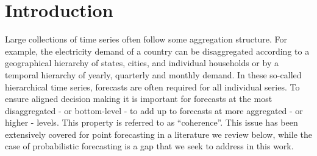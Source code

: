 \documentclass[a4paper, 11pt]{article}
\theoremstyle{theo}
\theoremstyle{definition}
\begin{document}
\section{Introduction}\label{sec:intro}

Large collections of time series often follow some aggregation structure.  For example, the electricity demand of a country can be disaggregated according to a geographical hierarchy of states, cities, and individual households or by a temporal hierarchy of yearly, quarterly and monthly demand. In these so-called hierarchical time series, forecasts are often required for all individual series.  To ensure aligned decision making it is important for forecasts at the most disaggregated - or bottom-level - to add up to forecasts at more aggregated - or higher - levels. This property is referred to as ``coherence''.  This issue has been extensively covered for point forecasting in a literature we review below, while the case of probabilistic forecasting is a gap that we seek to address in this work.
\end{document}
